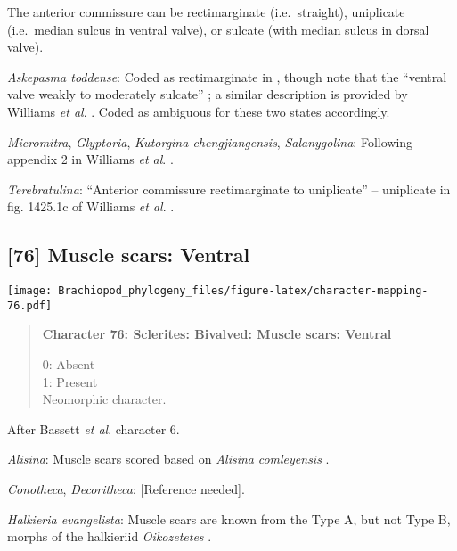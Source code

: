 \documentclass[openany]{book}
\theoremstyle{definition}
\theoremstyle{definition}
\theoremstyle{definition}
\theoremstyle{remark}
\begin{document}
The anterior commissure can be rectimarginate (i.e.~straight),
uniplicate (i.e.~median sulcus in ventral valve), or sulcate (with
median sulcus in dorsal valve).

\hypertarget{Askepasma_toddense-coding-75}{}
\emph{Askepasma toddense}: Coded as rectimarginate in
\citet{Williams1998Thediversity}, though note that the ``ventral valve
weakly to moderately sulcate'' \citep{Topper2013Theoldest}; a similar
description is provided by Williams \emph{et al}.
\citeyearpar{Williams2000LinguliformeaCraniiformea}. Coded as ambiguous
for these two states accordingly.

\hypertarget{Glyptoria-coding-75}{}
\emph{Micromitra}, \emph{Glyptoria}, \emph{Kutorgina chengjiangensis},
\emph{Salanygolina}: Following appendix 2 in Williams \emph{et al}.
\citeyearpar{Williams1998Thediversity}.

\hypertarget{Terebratulina-coding-75}{}
\emph{Terebratulina}: ``Anterior commissure rectimarginate to
uniplicate'' -- uniplicate in fig. 1425.1c of Williams \emph{et al}.
\citeyearpar{Williams2006Rhynchonelliformeapart}.

\subsection*{{[}76{]} Muscle scars: Ventral}\label{muscle-scars-ventral}

\texttt{[image: Brachiopod\_phylogeny\_files/figure-latex/character-mapping-76.pdf]}

\begin{quote}
\textbf{Character 76: Sclerites: Bivalved: Muscle scars: Ventral }

0: Absent\\
1: Present\\
Neomorphic character.
\end{quote}

After Bassett \emph{et al}.
\citeyearpar{Bassett2001Functionalmorphology} character 6.

\hypertarget{Alisina-coding-76}{}
\emph{Alisina}: Muscle scars scored based on \emph{Alisina}
\emph{comleyensis} \citep{Bassett2001Functionalmorphology}.

\hypertarget{Conotheca-coding-76}{}
\emph{Conotheca}, \emph{Decoritheca}: {[}Reference needed{]}.

\hypertarget{Halkieria_evangelista-coding-76}{}
\emph{Halkieria evangelista}: Muscle scars are known from the Type A,
but not Type B, morphs of the halkieriid \emph{Oikozetetes}
\citep{Paterson2009, Jacquet2014}.
\end{document}
